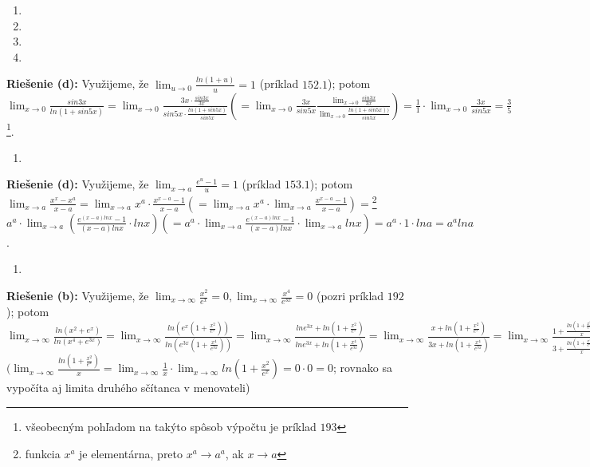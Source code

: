 \begin{enumerate}[resume]
  \item {}
  \item {}
  \item {}
  \item {}
\end{enumerate}

\textbf{Riešenie (d):}
Využijeme, že $\lim_{u \rightarrow 0}\frac{ln(1+u)}{u}=1$ (príklad $152.1$); potom $\lim_{x \rightarrow 0}\frac{sin 3x}{ln(1+sin 5x)}=\lim_{x \rightarrow 0}\frac{3x \cdot \frac{sin 3x}{3x}}{sin 5x \cdot \frac{ln (1+sin 5x)}{sin 5x}}(=\lim_{x \rightarrow 0} \frac{3x}{sin 5x} \frac{\lim_{x \rightarrow 0}\frac{sin 3x}{3x}}{\lim_{x \rightarrow 0} \frac{ln(1+sin 5x))}{sin 5x}})=\frac{1}{1}\cdot \lim_{x \rightarrow 0}\frac{3x}{sin 5x}=\frac{3}{5}$
\footnote{všeobecným pohľadom na takýto spôsob výpočtu je príklad $193$}.
\begin{enumerate}[resume]
  \item {}
\end{enumerate}

\textbf{Riešenie (d):}
Využijeme, že $\lim_{x \rightarrow a}\frac{e^u-1}{u}=1$ (príklad $153.1$); potom $\lim_{x \rightarrow a}\frac{x^x-x^a}{x-a}=\lim_{x \rightarrow a}x^a \cdot \frac{x^{x-a}-1}{x-a}(=\lim_{x \rightarrow a}x^a \cdot \lim_{x \rightarrow a}\frac{x^{x-a}-1}{x-a})=$\footnote{funkcia $x^a$ je elementárna, preto $x^a \rightarrow a^a$, ak $x \rightarrow a$} $a^a \cdot \lim_{x \rightarrow a}(\frac{e^{(x-a)ln x}-1}{(x-a)ln x}\cdot ln x)(=a^a \cdot \lim_{x \rightarrow a}\frac{e^{(x-a)ln x}-1}{(x-a)ln x}\cdot \lim_{x \rightarrow a}ln x)=a^a \cdot 1 \cdot ln a=a^a ln a$.

\begin{enumerate}[resume]
  \item {}
\end{enumerate}

\textbf{Riešenie (b):}
Využijeme, že $\lim_{x \rightarrow \infty} \frac{x^2}{e^x}=0,\lim_{x \rightarrow \infty}\frac{x^4}{e^{3x}}=0$ (pozri príklad $192$); potom
$\lim_{x \rightarrow \infty} \frac{ln(x^2+e^x)}{ln(x^4+e^{3x})}=\lim_{x \rightarrow \infty} \frac{ln(e^x(1+\frac{x^2}{e^x}))}{ln(e^{3x}(1+\frac{x^4}{e^{3x}}))}=\lim_{x \rightarrow \infty}\frac{ln e^{3x}+ln(1+\frac{x^2}{e^x})}{ln e^{3x}+ln(1+\frac{x^4}{e^{3x}})}=\lim_{x \rightarrow \infty}\frac{x+ln(1+\frac{x^2}{e^x})}{3x+ln(1+\frac{x^4}{e^{3x}})}=\lim_{x \rightarrow \infty}\frac{1+\frac{ln(1+\frac{x^2}{e^x})}{x}}{3+\frac{ln(1+\frac{x^4}{e^x})}{x}}=\frac{1}{3}$ 	$(\lim_{x \rightarrow \infty}\frac{ln(1+\frac{x^2}{e^x})}{x}=\lim_{x \rightarrow \infty}\frac{1}{x} \cdot \lim_{x \rightarrow \infty}ln(1+\frac{x^2}{e^x})=0 \cdot 0=0$; rovnako sa vypočíta aj limita druhého sčítanca v menovateli)

